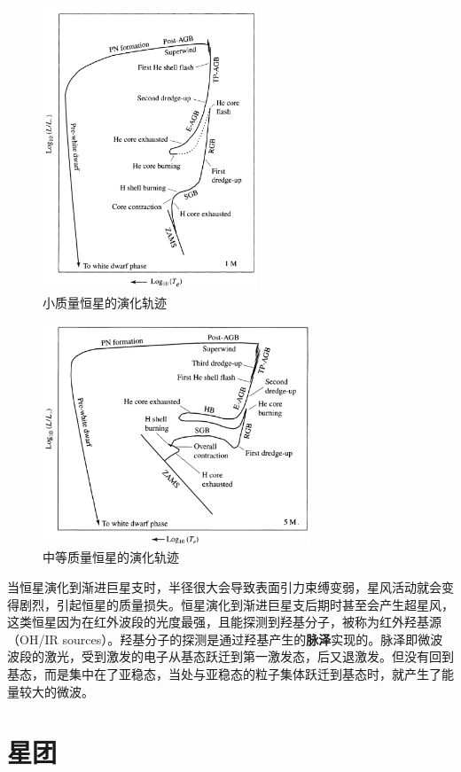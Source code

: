 \begin{figure}[hbt]
  \centering
  \includegraphics[width=6.4cm]{chapters/13/lowmass}
  \caption{小质量恒星的演化轨迹}
  \label{}
\end{figure}

\begin{figure}[hbt]
  \centering
  \includegraphics[width=8cm]{chapters/13/intermediate}
  \caption{中等质量恒星的演化轨迹}
  \label{}
\end{figure}

当恒星演化到渐进巨星支时，半径很大会导致表面引力束缚变弱，星风活动就会变得剧烈，引起恒星的质量损失。恒星演化到渐进巨星支后期时甚至会产生超星风，这类恒星因为在红外波段的光度最强，且能探测到羟基分子，被称为红外羟基源（OH/IR sources）。羟基分子的探测是通过羟基产生的\textbf{脉泽}实现的。脉泽即微波波段的激光，受到激发的电子从基态跃迁到第一激发态，后又退激发。但没有回到基态，而是集中在了亚稳态，当处与亚稳态的粒子集体跃迁到基态时，就产生了能量较大的微波。


\section{星团}

